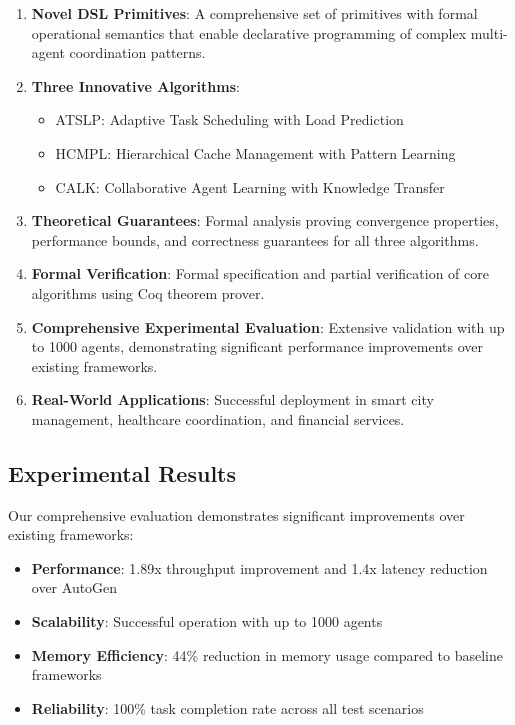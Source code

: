 \documentclass[conference]{IEEEtran}
\begin{document}
\begin{enumerate}
\item \textbf{Novel DSL Primitives}: A comprehensive set of primitives with formal operational semantics that enable declarative programming of complex multi-agent coordination patterns.

\item \textbf{Three Innovative Algorithms}: 
   \begin{itemize}
   \item ATSLP: Adaptive Task Scheduling with Load Prediction
   \item HCMPL: Hierarchical Cache Management with Pattern Learning  
   \item CALK: Collaborative Agent Learning with Knowledge Transfer
   \end{itemize}

\item \textbf{Theoretical Guarantees}: Formal analysis proving convergence properties, performance bounds, and correctness guarantees for all three algorithms.

\item \textbf{Formal Verification}: Formal specification and partial verification of core algorithms using Coq theorem prover.

\item \textbf{Comprehensive Experimental Evaluation}: Extensive validation with up to 1000 agents, demonstrating significant performance improvements over existing frameworks.

\item \textbf{Real-World Applications}: Successful deployment in smart city management, healthcare coordination, and financial services.
\end{enumerate}

\subsection{Experimental Results}

Our comprehensive evaluation demonstrates significant improvements over existing frameworks:

\begin{itemize}
\item \textbf{Performance}: 1.89x throughput improvement and 1.4x latency reduction over AutoGen
\item \textbf{Scalability}: Successful operation with up to 1000 agents
\item \textbf{Memory Efficiency}: 44\% reduction in memory usage compared to baseline frameworks
\item \textbf{Reliability}: 100\% task completion rate across all test scenarios
\end{itemize}
\end{document}
